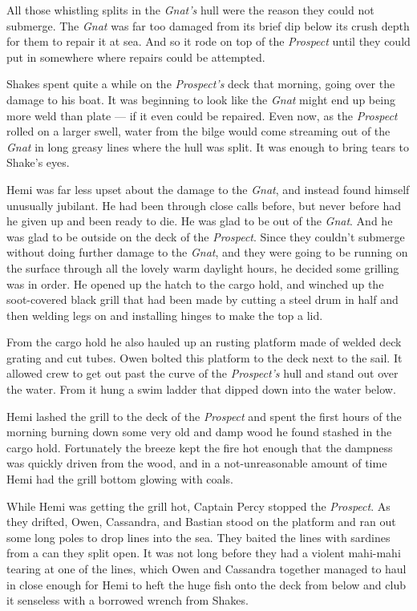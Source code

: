 \documentclass[
]{scrbook}
\begin{document}
All those whistling splits in the \emph{Gnat's} hull were the reason
they could not submerge. The \emph{Gnat} was far too damaged from its
brief dip below its crush depth for them to repair it at sea. And so it
rode on top of the \emph{Prospect} until they could put in somewhere
where repairs could be attempted.

Shakes spent quite a while on the \emph{Prospect's} deck that morning,
going over the damage to his boat. It was beginning to look like the
\emph{Gnat} might end up being more weld than plate --- if it even could
be repaired. Even now, as the \emph{Prospect} rolled on a larger swell,
water from the bilge would come streaming out of the \emph{Gnat} in long
greasy lines where the hull was split. It was enough to bring tears to
Shake's eyes.

Hemi was far less upset about the damage to the \emph{Gnat}, and instead
found himself unusually jubilant. He had been through close calls
before, but never before had he given up and been ready to die. He was
glad to be out of the \emph{Gnat}. And he was glad to be outside on the
deck of the \emph{Prospect}. Since they couldn't submerge without doing
further damage to the \emph{Gnat}, and they were going to be running on
the surface through all the lovely warm daylight hours, he decided some
grilling was in order. He opened up the hatch to the cargo hold, and
winched up the soot-covered black grill that had been made by cutting a
steel drum in half and then welding legs on and installing hinges to
make the top a lid.

From the cargo hold he also hauled up an rusting platform made of welded
deck grating and cut tubes. Owen bolted this platform to the deck next
to the sail. It allowed crew to get out past the curve of the
\emph{Prospect's} hull and stand out over the water. From it hung a swim
ladder that dipped down into the water below.

Hemi lashed the grill to the deck of the \emph{Prospect} and spent the
first hours of the morning burning down some very old and damp wood he
found stashed in the cargo hold. Fortunately the breeze kept the fire
hot enough that the dampness was quickly driven from the wood, and in a
not-unreasonable amount of time Hemi had the grill bottom glowing with
coals.

While Hemi was getting the grill hot, Captain Percy stopped the
\emph{Prospect}. As they drifted, Owen, Cassandra, and Bastian stood on
the platform and ran out some long poles to drop lines into the sea.
They baited the lines with sardines from a can they split open. It was
not long before they had a violent mahi-mahi tearing at one of the
lines, which Owen and Cassandra together managed to haul in close enough
for Hemi to heft the huge fish onto the deck from below and club it
senseless with a borrowed wrench from Shakes.
\end{document}
